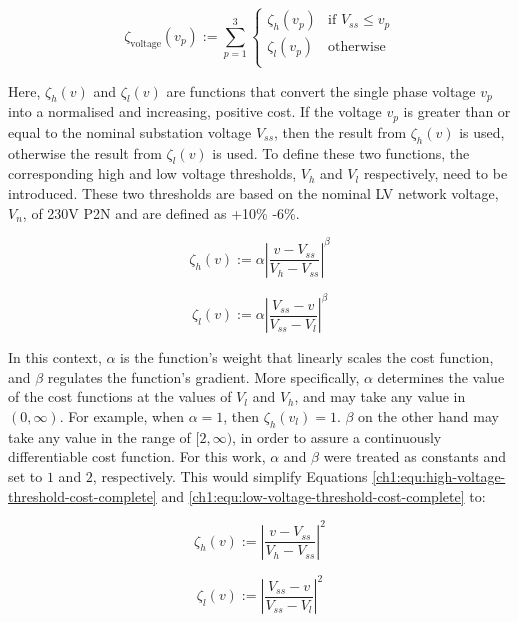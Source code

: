 \begin{equation}
	\zeta_\text{voltage}(v_{p}) := \sum_{p=1}^{3}{\begin{cases}
		\zeta_h(v_p) & \text{if } V_{ss} \leq v_p\\
		\zeta_l(v_p) & \text{otherwise}\\
	\end{cases}}
	\label{ch1:equ:voltage-deviation}
\end{equation}

Here, $\zeta_h(v)$ and $\zeta_l(v)$ are functions that convert the single phase voltage $v_p$ into a normalised and increasing, positive cost.
If the voltage $v_p$ is greater than or equal to the nominal substation voltage $V_{ss}$, then the result from $\zeta_h(v)$ is used, otherwise the result from $\zeta_l(v)$ is used.
To define these two functions, the corresponding high and low voltage thresholds, $V_h$ and $V_l$ respectively, need to be introduced.
These two thresholds are based on the nominal LV network voltage, $V_n$, of 230V P2N and are defined as +10\% -6\%.

\begin{equation}
	\zeta_h(v) := \alpha \left|\frac{v-V_{ss}}{V_h-V_{ss}}\right|^{\beta}
	\label{ch1:equ:high-voltage-threshold-cost-complete}
\end{equation}

\begin{equation}
	\zeta_l(v) := \alpha \left|\frac{V_{ss}-v}{V_{ss}-V_l}\right|^{\beta}
	\label{ch1:equ:low-voltage-threshold-cost-complete}
\end{equation}

In this context, $\alpha$ is the function's weight that linearly scales the cost function, and $\beta$ regulates the function's gradient.
More specifically, $\alpha$ determines the value of the cost functions at the values of $V_l$ and $V_h$, and may take any value in $(0, \infty)$.
For example, when $\alpha = 1$, then $\zeta_{h}(v_l) = 1$.
$\beta$ on the other hand may take any value in the range of $[2, \infty)$, in order to assure a continuously differentiable cost function.
For this work, $\alpha$ and $\beta$ were treated as constants and set to $1$ and $2$, respectively.
This would simplify Equations \ref{ch1:equ:high-voltage-threshold-cost-complete} and \ref{ch1:equ:low-voltage-threshold-cost-complete} to:

\begin{equation}
	\zeta_h(v) := \left|\frac{v-V_{ss}}{V_h-V_{ss}}\right|^{2}
	\label{ch1:equ:high-voltage-threshold-cost-simple}
\end{equation}

\begin{equation}
	\zeta_l(v) := \left|\frac{V_{ss}-v}{V_{ss}-V_l}\right|^{2}
	\label{ch1:equ:low-voltage-threshold-cost-simple}
\end{equation}